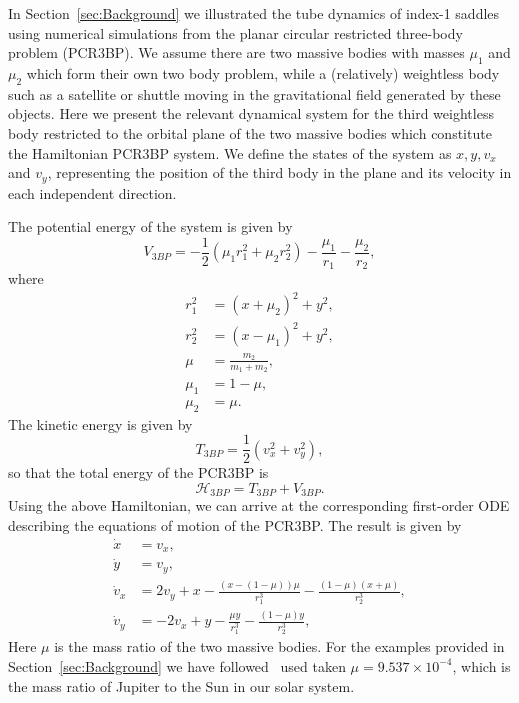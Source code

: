 \documentclass[11pt]{article}
\numberwithin{equation}{section}
\theoremstyle{plain}
\begin{document}
In Section~\ref{sec:Background} we illustrated the tube dynamics of index-1 saddles using numerical simulations from the planar circular restricted three-body problem (PCR3BP). We assume there are two massive bodies with masses $\mu_1$ and $\mu_2$ which form their own two body problem, while a (relatively) weightless body such as a satellite or shuttle moving in the gravitational field generated by these objects. Here we present the relevant dynamical system for the third weightless body restricted to the orbital plane of the two massive bodies which constitute the Hamiltonian PCR3BP system. We define the states of the system as $x, y, v_x$ and $v_y$, representing the position of the third body in the plane and its velocity in each independent direction. 

The potential energy of the system is given by 
\begin{equation}
    \label{TBP_V}
    V_{3BP}=-\frac{1}{2}\left(\mu_{1} r_{1}^{2}+\mu_{2} r_{2}^{2}\right)-\frac{\mu_{1}}{r_{1}}-\frac{\mu_{2}}{r_{2}},
\end{equation}
where 
\begin{equation}\label{TBP_Parameters}
    \begin{split}
        r_{1}^{2}&=\left(x+\mu_{2}\right)^{2}+y^{2}, \\
        r_{2}^{2}&=\left(x-\mu_{1}\right)^{2}+y^{2},\\
        \mu&=\frac{m_{2}}{m_{1}+m_{2}},\\
        \mu_1&=1-\mu,\\
        \mu_2&=\mu.
    \end{split}
\end{equation}
The kinetic energy is given by
\begin{equation}
    T_{3BP}=\frac{1}{2}(v_x^2+v_y^2),
\end{equation}
so that the total energy of the PCR3BP is 
\begin{equation}\label{Eng_TBP}
    \mathcal{H}_{3BP}=T_{3BP}+V_{3BP}.
\end{equation}
Using the above Hamiltonian, we can arrive at the corresponding first-order ODE describing the equations of motion of the PCR3BP. The result is given by
\begin{equation}\label{PCR3BP_EOM}
    \begin{split}
        \dot{x}&=v_x,\\
        \dot{y}&=v_y,\\
        \dot{v}_x&=2v_y+x-\frac{(x-(1 - \mu))\mu}{r_1^3}-\frac{(1 - \mu)(x+\mu)}{r_2^3},\\
        \dot{v}_y&=-2v_x+y-\frac{\mu y}{r_1^3}-\frac{(1-\mu)y}{r_2^3},
    \end{split}
\end{equation}
Here $\mu$ is the mass ratio of the two massive bodies. For the examples provided in Section~\ref{sec:Background} we have followed~\cite{Koon} used taken $\mu=9.537\times 10^{-4}$, which is the mass ratio of Jupiter to the Sun in our solar system. 
\end{document}
